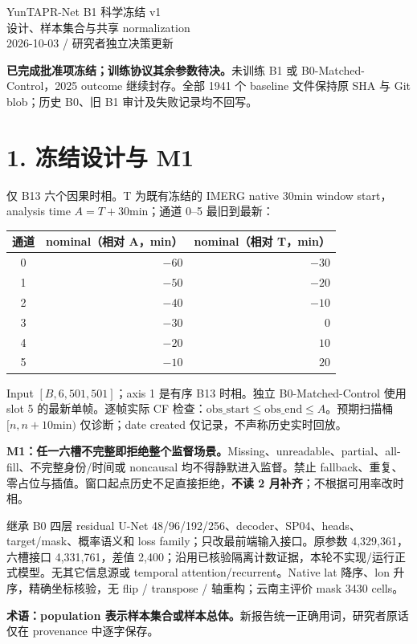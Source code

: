 \documentclass[11pt,a4paper,fontset=windows]{ctexart}
\begin{document}
\begin{center}{\LARGE YunTAPR-Net B1 科学冻结 v1}\\[5pt]
{\large 设计、样本集合与共享 normalization}\\[3pt]
2026-10-03 / 研究者独立决策更新\end{center}
\textbf{已完成批准项冻结；训练协议其余参数待决。}未训练 B1 或 B0-Matched-Control，2025 outcome 继续封存。全部 1941 个 baseline 文件保持原 SHA 与 Git blob；历史 B0、旧 B1 审计及失败记录均不回写。
\section*{1. 冻结设计与 M1}
仅 B13 六个因果时相。T 为既有冻结的 IMERG native 30min window start，analysis time $A=T+30$min；通道 0--5 最旧到最新：
\begin{center}\begin{tabular}{crr}\toprule
通道 & nominal（相对 A，min）& nominal（相对 T，min）\\\midrule
0 & $-60$ & $-30$\\1 & $-50$ & $-20$\\2 & $-40$ & $-10$\\
3 & $-30$ & $0$\\4 & $-20$ & $10$\\5 & $-10$ & $20$\\\bottomrule
\end{tabular}\end{center}
Input $[B,6,501,501]$；axis 1 是有序 B13 时相。独立 B0-Matched-Control 使用 slot 5 的最新单帧。逐帧实际 CF 检查：$\mathrm{obs\_start}\leq\mathrm{obs\_end}\leq A$。预期扫描桶 $[n,n+10\mathrm{min})$ 仅诊断；date created 仅记录，不声称历史实时回放。

\textbf{M1：任一六槽不完整即拒绝整个监督场景。}Missing、unreadable、partial、all-fill、不完整身份/时间或 noncausal 均不得静默进入监督。禁止 fallback、重复、零占位与插值。窗口起点历史不足直接拒绝，\textbf{不读 2 月补齐}；不根据可用率改时相。

继承 B0 四层 residual U-Net 48/96/192/256、decoder、SP04、heads、target/mask、概率语义和 loss family；只改最前端输入接口。原参数 4,329,361，六槽接口 4,331,761，差值 2,400；沿用已核验隔离计数证据，本轮不实现/运行正式模型。无其它信息源或 temporal attention/recurrent。Native lat 降序、lon 升序，精确坐标核验，无 flip / transpose / 轴重构；云南主评价 mask 3430 cells。

\textbf{术语：population 表示样本集合或样本总体。}新报告统一正确用词，研究者原话仅在 provenance 中逐字保存。
\newpage
\end{document}
